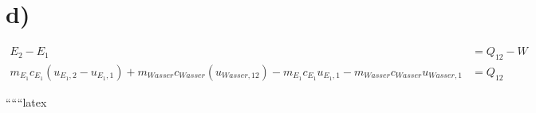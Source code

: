 

\section*{d)}
\begin{align*}
E_2 - E_1 &= Q_{12} - W \\
m_{E_1} c_{E_1} (u_{E_1,2} - u_{E_1,1}) + m_{Wasser} c_{Wasser} (u_{Wasser,12}) - m_{E_1} c_{E_1} u_{E_1,1} - m_{Wasser} c_{Wasser} u_{Wasser,1} &= Q_{12}
\end{align*}

``````latex